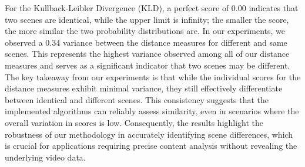 For the Kullback-Leibler Divergence (KLD), a perfect score of 0.00 indicates that two scenes are identical, while the upper limit is infinity; the smaller the score, the more similar the two probability distributions are. In our experiments, we observed a 0.34 variance between the distance measures for different and same scenes. This represents the highest variance observed among all of our distance measures and serves as a significant indicator that two scenes may be different.
The key takeaway from our experiments is that while the individual scores for the distance measures exhibit minimal variance, they still effectively differentiate between identical and different scenes. This consistency suggests that the implemented algorithms can reliably assess similarity, even in scenarios where the overall variation in scores is low. Consequently, the results highlight the robustness of our methodology in accurately identifying scene differences, which is crucial for applications requiring precise content analysis without revealing the underlying video data.

